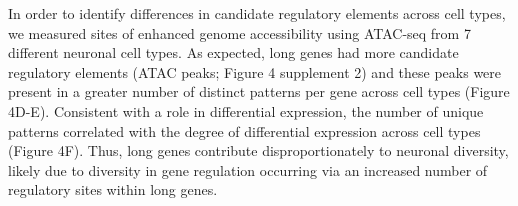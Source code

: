 In order to identify differences in candidate regulatory elements across cell types, we measured sites of enhanced genome accessibility using ATAC-seq \cite{Buenrostro_2013} from 7 different neuronal cell types. As expected, long genes had more candidate regulatory elements (ATAC peaks; Figure 4 supplement 2) and these peaks were present in a greater number of distinct patterns per gene across cell types (Figure 4D-E). Consistent with a role in differential expression, the number of unique patterns correlated with the degree of differential expression across cell types (Figure 4F). Thus, long genes contribute disproportionately to neuronal diversity, likely due to diversity in gene regulation occurring via an increased number of regulatory sites within long genes. 


